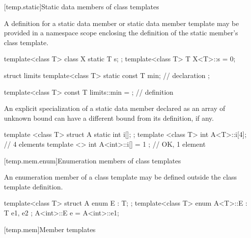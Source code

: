 [temp.static]{Static data members of class templates}

\pnum
{}%
A definition for a static data member or static data member template may be
provided in a namespace scope enclosing the definition of the static member's
class template.
\begin{example}
\begin{codeblock}
template<class T> class X {
  static T s;
};
template<class T> T X<T>::s = 0;

struct limits {
  template<class T>
    static const T min;                 // declaration
};

template<class T>
  const T limits::min = { };            // definition
\end{codeblock}
\end{example}

\pnum
An explicit specialization of a static data member declared as an array of unknown
bound can have a different bound from its definition, if any.
\begin{example}
\begin{codeblock}
template <class T> struct A {
  static int i[];
};
template <class T> int A<T>::i[4];      // 4 elements
template <> int A<int>::i[] = { 1 };    // OK, 1 element
\end{codeblock}
\end{example}

[temp.mem.enum]{Enumeration members of class templates}

\pnum
An enumeration member of a class template may be defined outside the class
template definition.
\begin{example}
\begin{codeblock}
template<class T> struct A {
  enum E : T;
};
template<class T> enum A<T>::E : T { e1, e2 };
A<int>::E e = A<int>::e1;
\end{codeblock}
\end{example}

[temp.mem]{Member templates}


